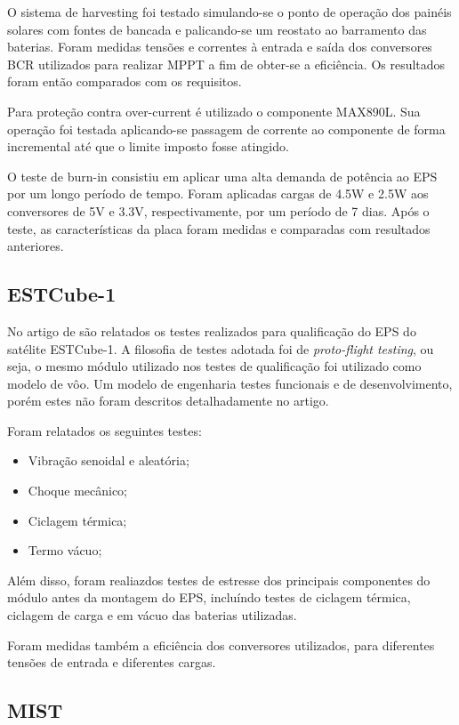 O sistema de harvesting foi testado simulando-se o ponto de operação dos painéis solares com fontes de bancada e palicando-se um reostato ao barramento das baterias. Foram medidas tensões e correntes à entrada e saída dos conversores \gls{BCR} utilizados para realizar \gls{MPPT} a fim de obter-se a eficiência.
Os resultados foram então comparados com os requisitos.

Para proteção contra over-current é utilizado o componente MAX890L. Sua operação foi testada aplicando-se passagem de corrente ao componente de forma incremental até que o limite imposto fosse atingido.

O teste de burn-in consistiu em aplicar uma alta demanda de potência ao EPS por um longo período de tempo.
Foram aplicadas cargas de 4.5W e 2.5W aos conversores de 5V e 3.3V, respectivamente, por um período de 7 dias. Após o teste, as características da placa foram medidas e comparadas com resultados anteriores.

\subsection*{ESTCube-1}

No artigo de \textcite{estcube-eps} são relatados os testes realizados para qualificação do \gls{EPS} do satélite ESTCube-1. A filosofia de testes adotada foi de \textit{proto-flight testing}, ou seja, o mesmo módulo utilizado nos testes de qualificação foi utilizado como modelo de vôo.
Um modelo de engenharia testes funcionais e de desenvolvimento, porém estes não foram descritos detalhadamente no artigo.

Foram relatados os seguintes testes:
\begin{itemize}
    \item Vibração senoidal e aleatória;
    \item Choque mecânico;
    \item Ciclagem térmica;
    \item Termo vácuo;
\end{itemize}

Além disso, foram realiazdos testes de estresse dos principais componentes do módulo antes da montagem do \gls{EPS}, incluíndo testes de ciclagem térmica, ciclagem de carga e em vácuo das baterias utilizadas.

Foram medidas também a eficiência dos conversores utilizados, para diferentes tensões de entrada e diferentes cargas.


\subsection*{MIST}

